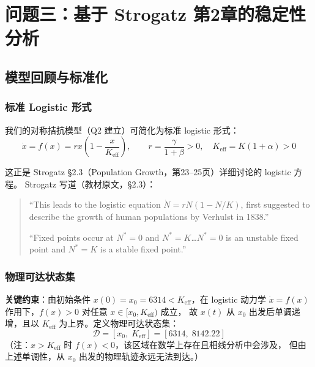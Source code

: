 \documentclass[12pt,a4paper]{article}
\begin{document}
\section{问题三：基于 Strogatz 第2章的稳定性分析}

\subsection{模型回顾与标准化}

\subsubsection{标准 Logistic 形式}
我们的对称拮抗模型（Q2 建立）可简化为标准 logistic 形式：
\begin{equation}\label{eq:logistic2}
\dot{x} = f(x) = r x \left(1 - \frac{x}{K_{\text{eff}}}\right), \qquad
r = \frac{\gamma}{1+\beta} > 0, \quad K_{\text{eff}} = K(1+\alpha) > 0
\end{equation}

这正是 Strogatz \S2.3（Population Growth，第23--25页）详细讨论的 logistic 方程。
Strogatz 写道（教材原文，\S2.3）：

\begin{quote}
\small
``This leads to the logistic equation $\dot{N} = rN(1 - N/K)$, first suggested to describe
the growth of human populations by Verhulst in 1838.''

\medskip
``Fixed points occur at $N^* = 0$ and $N^* = K$\ldots $N^* = 0$ is an unstable fixed point
and $N^* = K$ is a stable fixed point.''
\end{quote}

\subsubsection{物理可达状态集}
\label{sec:domain}

\textbf{关键约束}：由初始条件 $x(0) = x_0 = 6314 < K_{\text{eff}}$，在 logistic 动力学
$\dot{x} = f(x)$ 作用下，$f(x) > 0$ 对任意 $x \in [x_0, K_{\text{eff}})$ 成立，
故 $x(t)$ 从 $x_0$ 出发后单调递增，且以 $K_{\text{eff}}$ 为上界。定义物理可达状态集：
\begin{equation}
\mathcal{D} = [x_0,\; K_{\text{eff}}] = [6314,\; 8142.22]
\end{equation}
（注：$x > K_{\text{eff}}$ 时 $f(x) < 0$，该区域在数学上存在且相线分析中会涉及，
但由上述单调性，从 $x_0$ 出发的物理轨迹永远无法到达。）
\end{document}
